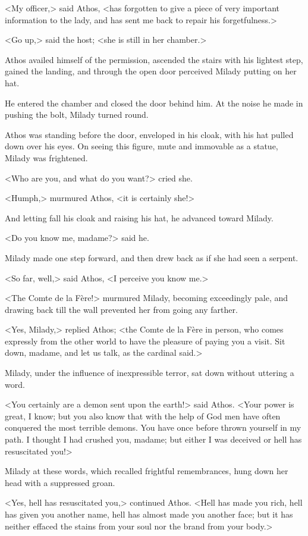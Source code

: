 <My officer,> said Athos, <has forgotten to give a piece of very important information to the lady, and has sent me back to repair his forgetfulness.> 

<Go up,> said the host; <she is still in her chamber.> 

Athos availed himself of the permission, ascended the stairs with his lightest step, gained the landing, and through the open door perceived Milady putting on her hat. 

He entered the chamber and closed the door behind him. At the noise he made in pushing the bolt, Milady turned round. 

Athos was standing before the door, enveloped in his cloak, with his hat pulled down over his eyes. On seeing this figure, mute and immovable as a statue, Milady was frightened. 

<Who are you, and what do you want?> cried she. 

<Humph,> murmured Athos, <it is certainly she!> 

And letting fall his cloak and raising his hat, he advanced toward Milady. 

<Do you know me, madame?> said he. 

Milady made one step forward, and then drew back as if she had seen a serpent. 

<So far, well,> said Athos, <I perceive you know me.> 

<The Comte de la Fère!> murmured Milady, becoming exceedingly pale, and drawing back till the wall prevented her from going any farther. 

<Yes, Milady,> replied Athos; <the Comte de la Fère in person, who comes expressly from the other world to have the pleasure of paying you a visit. Sit down, madame, and let us talk, as the cardinal said.> 

Milady, under the influence of inexpressible terror, sat down without uttering a word. 

<You certainly are a demon sent upon the earth!> said Athos. <Your power is great, I know; but you also know that with the help of God men have often conquered the most terrible demons. You have once before thrown yourself in my path. I thought I had crushed you, madame; but either I was deceived or hell has resuscitated you!> 

Milady at these words, which recalled frightful remembrances, hung down her head with a suppressed groan. 

<Yes, hell has resuscitated you,> continued Athos. <Hell has made you rich, hell has given you another name, hell has almost made you another face; but it has neither effaced the stains from your soul nor the brand from your body.> 

